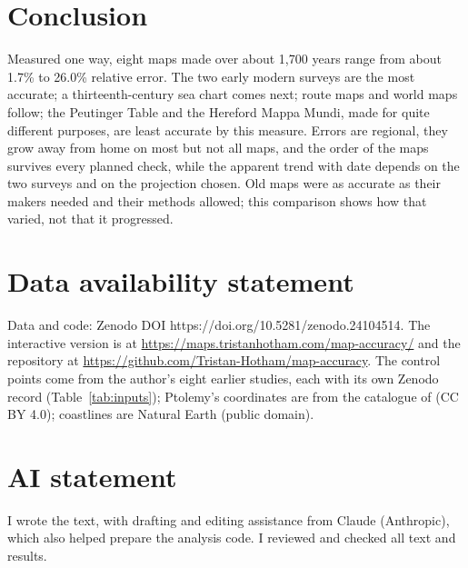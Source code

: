 \documentclass[11pt,a4paper]{article}
\begin{document}
\section{Conclusion}\label{sec:conc}
Measured one way, eight maps made over about 1,700 years range from about 1.7\% to 26.0\% relative error. The two early modern surveys are the most accurate; a thirteenth-century sea chart comes next; route maps and world maps follow; the Peutinger Table and the Hereford Mappa Mundi, made for quite different purposes, are least accurate by this measure. Errors are regional, they grow away from home on most but not all maps, and the order of the maps survives every planned check, while the apparent trend with date depends on the two surveys and on the projection chosen. Old maps were as accurate as their makers needed and their methods allowed; this comparison shows how that varied, not that it progressed.

\section*{Data availability statement}
Data and code: Zenodo DOI https://doi.org/10.5281/zenodo.24104514. The interactive version is at \url{https://maps.tristanhotham.com/map-accuracy/} and the repository at \url{https://github.com/Tristan-Hotham/map-accuracy}. The control points come from the author's eight earlier studies, each with its own Zenodo record (Table~\ref{tab:inputs}); Ptolemy's coordinates are from the catalogue of \citet{grasshoff2019} (CC BY 4.0); coastlines are Natural Earth (public domain).

\section*{AI statement}
I wrote the text, with drafting and editing assistance from Claude (Anthropic), which also helped prepare the analysis code. I reviewed and checked all text and results.
\end{document}
